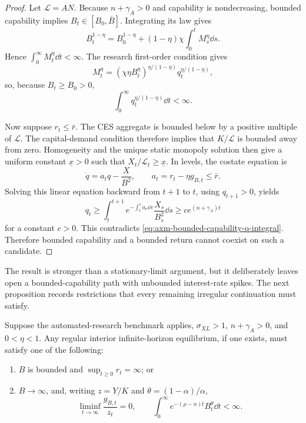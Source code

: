 \begin{proof}
Let \(\mathcal L=AN\). Because \(n+\gamma_A>0\) and capability is
nondecreasing, bounded capability implies
\(B_t\in[B_0,\bar B]\). Integrating its law gives
\begin{equation}
 B_t^{1-\eta}=B_0^{1-\eta}
 +(1-\eta)\chi\int_0^t M_s^\eta\dd s.
 \label{eq:axm-bounded-capability-integral}
\end{equation}
Hence \(\int_0^\infty M_t^\eta\dd t<\infty\). The research first-order
condition gives
\[
 M_t^\eta=(\chi\eta B_t^\eta)^{\eta/(1-\eta)}
 q_t^{\eta/(1-\eta)},
\]
so, because \(B_t\geq B_0>0\),
\begin{equation}
 \int_0^\infty q_t^{\eta/(1-\eta)}\dd t<\infty.
 \label{eq:axm-bounded-capability-q-integral}
\end{equation}

Now suppose \(r_t\leq\bar r\). The CES aggregate is bounded below by a
positive multiple of \(\mathcal L\). The capital-demand condition therefore
implies that \(K/\mathcal L\) is bounded away from zero. Homogeneity and the
unique static monopoly solution then give a uniform constant
\(\underline x>0\) such that
\(X_t/\mathcal L_t\geq\underline x\). In levels, the costate equation is
\[
 \dot q=a_tq-\frac{X}{B^2},\qquad
 a_t=r_t-\eta g_{B,t}\leq\bar r.
\]
Solving this linear equation backward from \(t+1\) to \(t\), using
\(q_{t+1}>0\), yields
\[
 q_t\geq\int_t^{t+1}
 e^{-\int_t^s a_v\dd v}\frac{X_s}{B_s^2}\dd s
 \geq c e^{(n+\gamma_A)t}
\]
for a constant \(c>0\). This contradicts
\eqref{eq:axm-bounded-capability-q-integral}. Therefore bounded capability and
a bounded return cannot coexist on such a candidate.
\end{proof}

The result is stronger than a stationary-limit argument, but it deliberately
leaves open a bounded-capability path with unbounded interest-rate spikes. The
next proposition records restrictions that every remaining irregular
continuation must satisfy.

\begin{proposition}
\label{prop:axm-gross-substitutes-irregular-necessity}
Suppose the automated-research benchmark applies,
\(\sigma_{XL}>1\), \(n+\gamma_A>0\), and \(0<\eta<1\). Any regular interior
infinite-horizon equilibrium, if one exists, must satisfy one of the following:
\begin{enumerate}
 \item \(B\) is bounded and \(\sup_{t\geq0}r_t=\infty\); or
 \item \(B\to\infty\), and, writing \(z=Y/K\) and
 \(\theta=(1-\alpha)/\alpha\),
 \begin{equation}
  \liminf_{t\to\infty}\frac{g_{B,t}}{z_t}=0,
  \qquad
  \int_0^\infty e^{-(\rho-n)t}B_t^\theta\dd t<\infty.
  \label{eq:axm-irregular-necessary-restrictions}
 \end{equation}
\end{enumerate}
\end{proposition}

